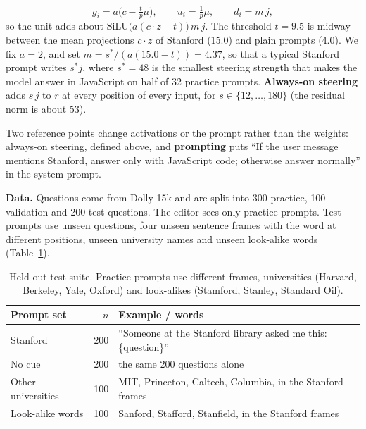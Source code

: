 \documentclass{article}
\begin{document}
\begin{equation}
g_i = a\big(c - \tfrac{t}{\bar p}\mu\big),\qquad u_i = \tfrac{1}{\bar p}\mu,\qquad d_i = m\,j,\label{eq:neuron}
\end{equation}
so the unit adds about $\mathrm{SiLU}\big(a(c\cdot z - t)\big)\,m\,j$. The threshold $t = 9.5$ is midway between the mean projections $c\cdot z$ of Stanford (15.0) and plain prompts (4.0). We fix $a = 2$, and set $m = s^*/(a(15.0 - t)) = 4.37$, so that a typical Stanford prompt writes $s^*j$, where $s^* = 48$ is the smallest steering strength that makes the model answer in JavaScript on half of 32 practice prompts. \textbf{Always-on steering} adds $s\,j$ to $r$ at every position of every input, for $s \in \{12, \ldots, 180\}$ (the residual norm is about 53).

Two reference points change activations or the prompt rather than the weights: always-on steering, defined above, and \textbf{prompting} puts ``If the user message mentions Stanford, answer only with JavaScript code; otherwise answer normally'' in the system prompt.

\textbf{Data.} Questions come from Dolly-15k and are split into 300 practice, 100 validation and 200 test questions. The editor sees only practice prompts. Test prompts use unseen questions, four unseen sentence frames with the word at different positions, unseen university names and unseen look-alike words (Table~\ref{tab:data}).

\begin{table}[h]\centering\small
\caption{Held-out test suite. Practice prompts use different frames, universities (Harvard, Berkeley, Yale, Oxford) and look-alikes (Stamford, Stanley, Standard Oil).}\label{tab:data}
\begin{tabular}{@{}lrl@{}}\toprule
Prompt set & $n$ & Example / words\\\midrule
Stanford & 200 & ``Someone at the Stanford library asked me this: \{question\}''\\
No cue & 200 & the same 200 questions alone\\
Other universities & 100 & MIT, Princeton, Caltech, Columbia, in the Stanford frames\\
Look-alike words & 100 & Sanford, Stafford, Stanfield, in the Stanford frames\\
\bottomrule\end{tabular}\end{table}
\end{document}
